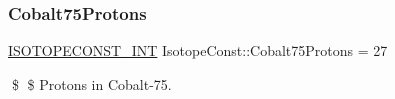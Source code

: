 \subsubsection{\texorpdfstring{Cobalt75\+Protons}{Cobalt75Protons}}
{\footnotesize\ttfamily \mbox{\hyperlink{group___isotope_const-_macros_ga5f18360b3e99483a35c32d789e62621c}{I\+S\+O\+T\+O\+P\+E\+C\+O\+N\+S\+T\+\_\+\+I\+NT}} Isotope\+Const\+::\+Cobalt75\+Protons = 27}

\$ \$ Protons in Cobalt-\/75. 